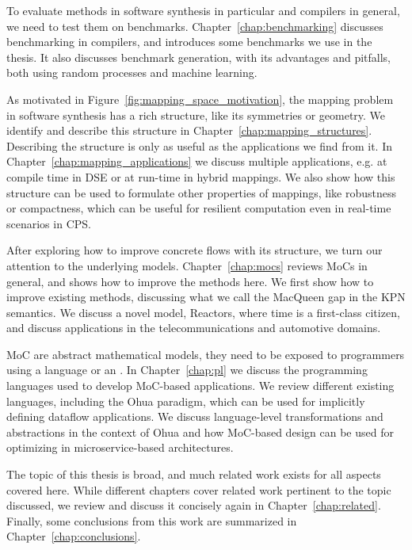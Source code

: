 To evaluate methods in software synthesis in particular and compilers in general, we need to test them on benchmarks. 
Chapter~\ref{chap:benchmarking} discusses benchmarking in compilers, and introduces some benchmarks we use in the thesis.
It also discusses benchmark generation, with its advantages and pitfalls, both using random processes and machine learning.

As motivated in Figure~\ref{fig:mapping_space_motivation}, the mapping problem in software synthesis has a rich structure, like its symmetries or geometry.
We identify and describe this structure in Chapter~\ref{chap:mapping_structures}.
Describing the structure is only as useful as the applications we find from it.
In Chapter~\ref{chap:mapping_applications} we discuss multiple applications, e.g. at compile time in \ac{DSE} or at run-time in hybrid mappings.
We also show how this structure can be used to formulate other properties of mappings, like robustness or compactness, which can be useful for resilient computation even in real-time scenarios in \ac{CPS}.

After exploring how to improve concrete flows with its structure, we turn our attention to the underlying models.
Chapter~\ref{chap:mocs} reviews \acfp{MoC} in general, and shows how to improve the methods here.
We first show how to improve existing methods, discussing what we call the MacQueen gap in the \ac{KPN} semantics.
We discuss a novel model, Reactors, where time is a first-class citizen, and discuss applications in the telecommunications and automotive domains.

\ac{MoC} are abstract mathematical models, they need to be exposed to programmers using a language or an .
In Chapter~\ref{chap:pl} we discuss the programming languages used to develop \ac{MoC}-based applications. 
We review different existing languages, including the Ohua paradigm, which can be used for implicitly defining dataflow applications.
We discuss language-level transformations and abstractions in the context of Ohua and how \ac{MoC}-based design can be used for optimizing  in microservice-based architectures.

The topic of this thesis is broad, and much related work exists for all aspects covered here. 
While different chapters cover related work pertinent to the topic discussed, we review and discuss it concisely again in Chapter~\ref{chap:related}.
Finally, some conclusions from this work are summarized in Chapter~\ref{chap:conclusions}.

